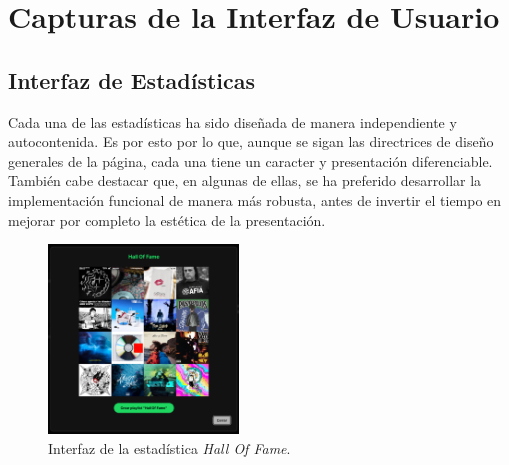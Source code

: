 \chapter{Capturas de la Interfaz de Usuario} \label{ch:anexoA}

\section{Interfaz de Estadísticas}

Cada una de las estadísticas ha sido diseñada de manera independiente y autocontenida. Es por esto por lo que, aunque se sigan las directrices de diseño generales de la página, cada una tiene un caracter y presentación diferenciable. También cabe destacar que, en algunas de ellas, se ha preferido desarrollar la implementación funcional de manera más robusta, antes de invertir el tiempo en mejorar por completo la estética de la presentación.

\begin{figure}[H]
  \centering
  \includegraphics[width=0.45\textwidth]{figures/capturas_ui/hall_of_fame.png}
  \caption{Interfaz de la estadística \textit{Hall Of Fame}.}
  \label{fig:hall_of_fame}
\end{figure}

